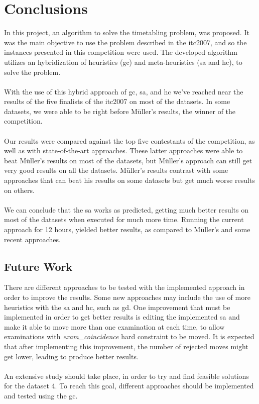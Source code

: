 \chapter{Conclusions}
\label{chap:FutureWork}

In this project, an algorithm to solve the timetabling problem, was proposed. It was the main objective to use the problem described in the \gls{itc2007}, and so the instances presented in this competition were used. The developed algorithm utilizes an hybridization of heuristics (\gls{gc}) and meta-heuristics (\gls{sa} and \gls{hc}), to solve the problem.\\
\\
With the use of this hybrid approach of \gls{gc}, \gls{sa}, and \gls{hc} we've reached near the results of the five finalists of the \gls{itc2007} on most of the datasets. In some datasets, we were able to be right before M\"{u}ller's results, the winner of the competition.\\
\\
Our results were compared against the top five contestants of the competition, as well as with state-of-the-art approaches. These latter approaches were able to beat M\"{u}ller's results on most of the datasets, but M\"{u}ller's approach can still get very good results on all the datasets. M\"{u}ller's results contrast with some approaches that can beat his results on some datasets but get much worse results on others.\\
\\
We can conclude that the \gls{sa} works as predicted, getting much better results on most of the datasets when executed for much more time. Running the current approach for 12 hours, yielded better results, as compared to M\"{u}ller's and some recent approaches.\\
\section{Future Work}
There are different approaches to be tested with the implemented approach in order to improve the results. Some new approaches may include the use of more heuristics with the \gls{sa} and \gls{hc}, such as \gls{gd}. One improvement that must be implemented in order to get better results is editing the implemented \gls{sa} and make it able to move more than one examination at each time, to allow examinations with \textit{exam\_coincidence} hard constraint to be moved. It is expected that after implementing this improvement, the number of rejected moves might get lower, leading to produce better results.\\
\\
An extensive study should take place, in order to try and find feasible solutions for the dataset 4. To reach this goal, different approaches should be implemented and tested using the \gls{gc}.
